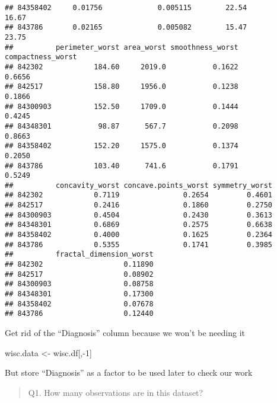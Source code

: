 \documentclass[
]{article}
\newenvironment{Shaded}{\begin{snugshade}}{\end{snugshade}}
\newcommand{\DecValTok}[1]{\textcolor[rgb]{0.00,0.00,0.81}{#1}}
\newcommand{\FunctionTok}[1]{\textcolor[rgb]{0.00,0.00,0.00}{#1}}
\newcommand{\NormalTok}[1]{#1}
\newcommand{\OtherTok}[1]{\textcolor[rgb]{0.56,0.35,0.01}{#1}}
\newcommand{\SpecialCharTok}[1]{\textcolor[rgb]{0.00,0.00,0.00}{#1}}
\begin{document}
\begin{verbatim}
## 84358402     0.01756             0.005115        22.54         16.67
## 843786       0.02165             0.005082        15.47         23.75
##          perimeter_worst area_worst smoothness_worst compactness_worst
## 842302            184.60     2019.0           0.1622            0.6656
## 842517            158.80     1956.0           0.1238            0.1866
## 84300903          152.50     1709.0           0.1444            0.4245
## 84348301           98.87      567.7           0.2098            0.8663
## 84358402          152.20     1575.0           0.1374            0.2050
## 843786            103.40      741.6           0.1791            0.5249
##          concavity_worst concave.points_worst symmetry_worst
## 842302            0.7119               0.2654         0.4601
## 842517            0.2416               0.1860         0.2750
## 84300903          0.4504               0.2430         0.3613
## 84348301          0.6869               0.2575         0.6638
## 84358402          0.4000               0.1625         0.2364
## 843786            0.5355               0.1741         0.3985
##          fractal_dimension_worst
## 842302                   0.11890
## 842517                   0.08902
## 84300903                 0.08758
## 84348301                 0.17300
## 84358402                 0.07678
## 843786                   0.12440
\end{verbatim}

Get rid of the ``Diagnosis'' column because we won't be needing it

\begin{Shaded}
\begin{Highlighting}[]
\NormalTok{wisc.data }\OtherTok{\textless{}{-}}\NormalTok{ wisc.df[,}\SpecialCharTok{{-}}\DecValTok{1}\NormalTok{]}
\end{Highlighting}
\end{Shaded}

But store ``Diagnosis'' as a factor to be used later to check our work

\begin{Shaded}
\end{Shaded}

\begin{quote}
Q1. How many observations are in this dataset?
\end{quote}
\end{document}
